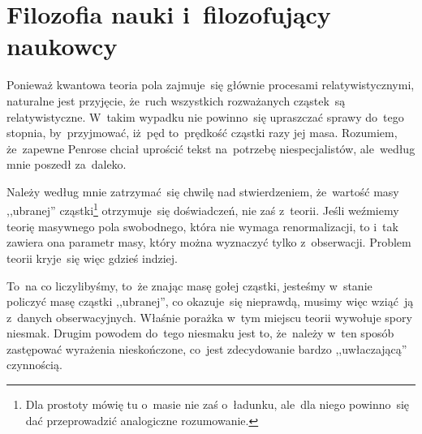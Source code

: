 \documentclass[a4paper,11pt]{article}
\begin{document}
\vspace{\spaceTwo}





\newpage
\section{Filozofia nauki i~filozofujący naukowcy}

\vspace{\spaceTwo}







\start {} Ponieważ kwantowa teoria pola zajmuje~się
głównie procesami relatywistycznymi, naturalne jest przyjęcie, że~ruch
wszystkich rozważanych cząstek~są relatywistyczne. W~takim wypadku nie
powinno~się upraszczać sprawy do~tego stopnia, by~przyjmować, iż~pęd
to~prędkość cząstki razy jej masa. Rozumiem, że~zapewne Penrose chciał
uprościć tekst na~potrzebę niespecjalistów, ale~według mnie poszedł
za~daleko.

\vspace{\spaceFour}


\start {} Należy według mnie zatrzymać~się chwilę nad
stwierdzeniem, że~wartość masy ,,ubranej'' cząstki\footnote{Dla
  prostoty mówię tu o~masie nie zaś o~ładunku, ale~dla niego
  powinno~się dać przeprowadzić analogiczne rozumowanie.}
otrzymuje~się doświadczeń, nie zaś z~teorii. Jeśli weźmiemy teorię
masywnego pola swobodnego, która nie wymaga renormalizacji, to i~tak
zawiera ona parametr masy, który można wyznaczyć tylko z~obserwacji.
Problem teorii kryje~się więc gdzieś indziej.

To~na co liczylibyśmy, to~że znając masę gołej cząstki, jesteśmy
w~stanie policzyć masę cząstki ,,ubranej'', co okazuje~się nieprawdą,
musimy więc wziąć~ją z~danych obserwacyjnych. Właśnie porażka w~tym
miejscu teorii wywołuje spory niesmak. Drugim powodem do~tego niesmaku
jest to, że~należy w~ten sposób zastępować wyrażenia nieskończone,
co~jest zdecydowanie bardzo ,,uwłaczającą'' czynnością.

\vspace{\spaceFour}
\end{document}
